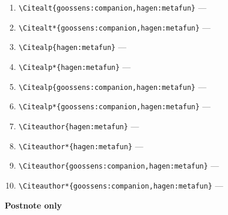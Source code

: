 \documentclass[12pt]{article}
\begin{document}
\begin{enumerate}
\verb|\Citealt*{goossens:companion}| ---
\item
\verb|\Citealt{goossens:companion,hagen:metafun}| ---
\item
\verb|\Citealt*{goossens:companion,hagen:metafun}| ---
\item
\verb|\Citealp{hagen:metafun}| ---
\item
\verb|\Citealp*{hagen:metafun}| ---
\item
\verb|\Citealp{goossens:companion,hagen:metafun}| ---
\item
\verb|\Citealp*{goossens:companion,hagen:metafun}| ---
\item
\verb|\Citeauthor{hagen:metafun}| ---
\item
\verb|\Citeauthor*{hagen:metafun}| ---
\item
\verb|\Citeauthor{goossens:companion,hagen:metafun}| ---
\item
\verb|\Citeauthor*{goossens:companion,hagen:metafun}| ---
\end{enumerate}

\textbf{Postnote only}
\end{document}

